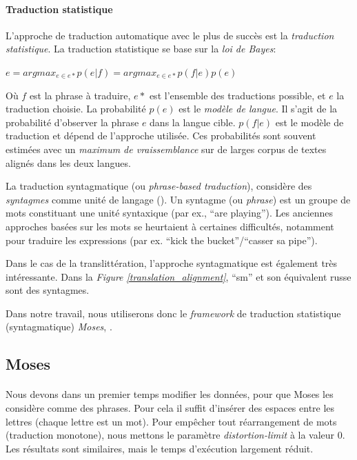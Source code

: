 \documentclass{article}
\begin{document}
\paragraph{Traduction statistique}
L'approche de traduction automatique avec le plus de succès est la \emph{traduction statistique}. La traduction statistique se base sur la \emph{loi de Bayes}:
\begin{center}
$e = arg max_{e \in e*} p(e|f) = arg max_{e \in e*} p(f|e)p(e)$
\end{center}
Où $f$ est la phrase à traduire, $e*$ est l'ensemble des traductions possible, et $e$ la traduction choisie. La probabilité $p(e)$ est le \emph{modèle de langue}. Il s'agit de la probabilité d'observer la phrase $e$ dans la langue cible. $p(f|e)$ est le modèle de traduction et dépend de l'approche utilisée. Ces probabilités sont souvent estimées avec un \emph{maximum de vraissemblance} sur de larges corpus de textes alignés dans les deux langues.


La traduction syntagmatique (ou \emph{phrase-based traduction}), considère des \emph{syntagmes} comme unité de langage (\cite{Koehn03}). Un syntagme (ou \emph{phrase}) est un groupe de mots constituant une unité syntaxique (par ex., ``are playing''). Les anciennes approches basées sur les mots se heurtaient à certaines difficultés, notamment pour traduire les expressions (par ex. ``kick the bucket''/``casser sa pipe'').

Dans le cas de la translittération, l'approche syntagmatique est également très intéressante. Dans la \emph{Figure \ref{translation_alignment}}, ``sm'' et son équivalent russe sont des syntagmes.

Dans notre travail, nous utiliserons donc le \emph{framework} de traduction statistique (syntagmatique) \emph{Moses}, \cite{Koehn07}.

\subsection{Moses}
\paragraph{}
Nous devons dans un premier temps modifier les données, pour que Moses les considère comme des phrases. Pour cela il suffit d'insérer des espaces entre les lettres (chaque lettre est un mot). Pour empêcher tout réarrangement de mots (traduction monotone), nous mettons le paramètre \emph{distortion-limit} à la valeur $0$. Les résultats sont similaires, mais le temps d'exécution largement réduit.
\end{document}
